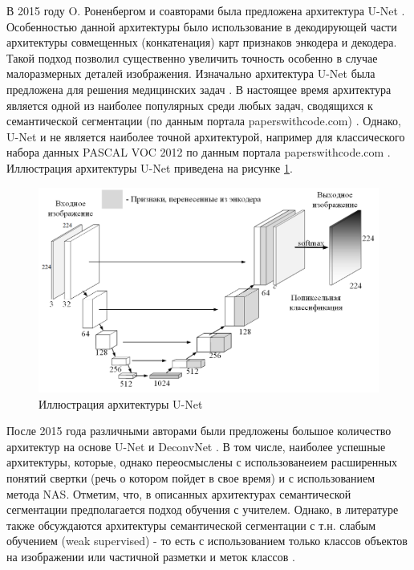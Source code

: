 \documentclass[12pt]{article}
\begin{document}
\begin{sloppypar}
В 2015 году  O. Роненбергом и соавторами была предложена архитектура U-Net \cite{ronneberger2015u}.  Особенностью данной архитектуры было использование в декодирующей части архитектуры совмещенных (конкатенация) карт признаков энкодера и декодера. Такой подход позволил существенно увеличить точность особенно в случае малоразмерных деталей изображения. Изначально архитектура U-Net была предложена для решения медицинских задач \cite{punn2021modality}. В настоящее время архитектура является одной из наиболее популярных среди любых задач, сводящихся к семантической сегментации (по данным портала paperswithcode.com) \cite{paperswithcodeSemanticSegmentation}. Однако, U-Net и не является наиболее точной архитектурой, например для классического набора данных PASCAL VOC 2012 \cite{pascalVOC} по данным портала paperswithcode.com \cite{paperswithcodePASCALVOCSematic}. Иллюстрация архитектуры U-Net приведена на рисунке \ref{ch1:fig:UNet}. 

     \begin{figure}[!h]
    	\begin{center}
    		\includegraphics[width=0.89\linewidth]{./figuresch1/UNet.png}
    		\caption{Иллюстрация  архитектуры  U-Net}	
    		\label{ch1:fig:UNet}
    	\end{center}
    \end{figure}
    
После 2015 года различными авторами были предложены большое количество архитектур на основе U-Net и DeconvNet \cite{taghanaki2021deep}.
В том числе, наиболее успешные архитектуры, которые, однако переосмыслены с использованеием расширенных понятий свертки (речь о котором пойдет в свое время) и с использованием метода NAS. 
Отметим, что, в описанных архитектурах семантической сегментации предполагается подход обучения с учителем. Однако, в литературе также обсуждаются архитектуры семантической сегментации с т.н. слабым обучением (weak supervised) - то есть с использованием только классов объектов на изображении или частичной разметки и меток классов \cite{zhang2020survey}.   


\end{sloppypar}
\end{document}
